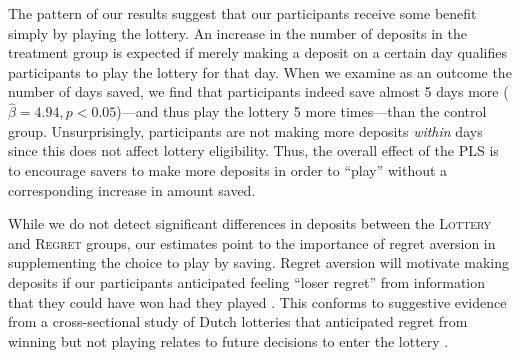\documentclass[11pt]{article}
\begin{document}

		The pattern of our results suggest that our participants receive some benefit simply by playing the lottery. An increase in the number of deposits in the treatment group is expected if merely making a deposit on a certain day qualifies participants to play the lottery for that day. When we examine as an outcome the number of days saved, we find that participants indeed save almost 5 days more ($\hat \beta = 4.94, p < 0.05$)---and thus play the lottery 5 more times---than the control group. Unsurprisingly, participants are not making more deposits \textit{within} days since this does not affect lottery eligibility. Thus, the overall effect of the PLS is to encourage savers to make more deposits in order to ``play'' without a corresponding increase in amount saved. %


		While we do not detect significant differences in deposits between the \textsc{Lottery} and \textsc{Regret} groups, our estimates point to the importance of regret aversion in supplementing the choice to play by saving. Regret aversion will motivate making deposits if our participants anticipated feeling ``loser regret'' from information that they could have won had they played . This conforms to suggestive evidence from a cross-sectional study of Dutch lotteries that anticipated regret from winning but not playing relates to future decisions to enter the lottery .




		
		
\end{document}
